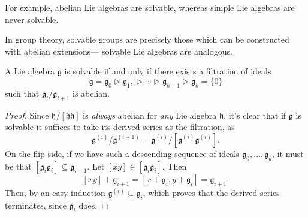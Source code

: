 \documentclass{article}
\newcommand*\tge{\ensuremath{\mathrel{\rhd}}}
\newcommand{\lb}[1]{\ensuremath{\left[{#1}\right]}}
\newcommand*\frkg{{\ensuremath{\mathfrak{g}}}}
\newcommand*\frkh{{\ensuremath{\mathfrak{h}}}}
\begin{document}
For example, abelian Lie algebras are solvable, whereas simple Lie algebras are never solvable.

In group theory, solvable groups are precisely those which can be constructed with abelian extensions--- solvable Lie algebras are analogous.

\begin{proposition}
    A Lie algebra $\frkg$ is solvable if and only if there exists a filtration of ideals
    \[
        \frkg = \frkg_0 \tge \frkg_1, \tge \cdots \tge \frkg_{k-1} \tge \frkg_k = \{0\}
    \]
    such that $\frkg_i / \frkg_{i+1}$ is abelian.
\end{proposition}

\begin{proof}
    Since $\frkh/\lb{\frkh\frkh}$ is \textit{always} abelian for \textit{any} Lie algebra $\frkh$, it's clear that if $\frkg$ is solvable it suffices to take its derived series as the filtration, as
    \[
        \frkg^{(i)}/\frkg^{(i+1)}
        =
        \frkg^{(i)}\Big/\lb{\frkg^{(i)}\frkg^{(i)}}.
    \]
    On the flip side, if we have such a descending sequence of ideals $\frkg_0, \ldots, \frkg_k$, it must be that $\lb{\frkg_i\frkg_i} \subseteq \frkg_{i+1}$. 
    Let $\lb{xy} \in \lb{\frkg_i\frkg_i}$.
    Then
    \[
        \lb{xy} + \frkg_{i+1}
        =
        \lb{x + \frkg_i, y + \frkg_i}
        =
        \frkg_{i+1}.
    \]
    Then, by an easy induction $\frkg^{(i)} \subseteq \frkg_i$, which proves that the derived series terminates, since $\frkg_i$ does.
\end{proof}
\end{document}
